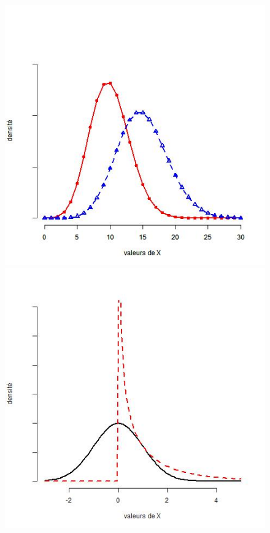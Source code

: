 \begin{figure}[h!] %
	\centering
	\hspace{-2cm}
	\begin{minipage}[c]{.46\linewidth}
      \includegraphics[scale=0.5]{figures/concepts/chapitre1-fig2-1.jpeg}
			\end{minipage} %
   \begin{minipage}[c]{.46\linewidth}
			\includegraphics[scale=0.5]{figures/concepts/chapitre1-fig2-2.jpeg}

\end{minipage}
\end{figure}
